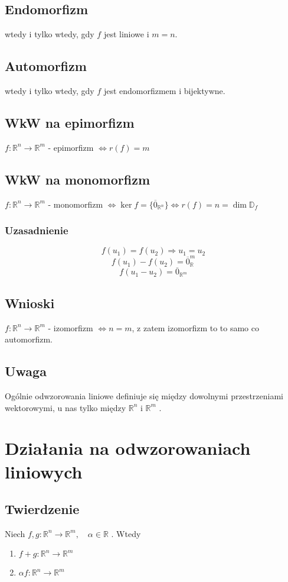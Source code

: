 \documentclass[11pt]{article}
\begin{document}
\subsection{Endomorfizm}
wtedy i tylko wtedy, gdy $f$ jest liniowe i $m = n $.
\subsection{Automorfizm}
wtedy i tylko wtedy, gdy $f$ jest endomorfizmem i bijektywne.

\subsection{WkW na epimorfizm}
$f: \mathbb{R}^n \to \mathbb{R}^m$ - epimorfizm $\iff r(f) = m$

\subsection{WkW na monomorfizm}
$f: \mathbb{R}^n \to \mathbb{R}^m$ - monomorfizm $\iff \ker{f} = \{\overline{0}_{\mathbb{R}^n}\} \iff r(f) = n = \dim{\mathbb{D}_f}$
\subsubsection{Uzasadnienie}
$$f(u_1) = f(u_2) \Longrightarrow u_1 = u_2$$
$$f(u_1) -f(u_2) = \overline{0}_{\mathbb{R}}^m$$
$$f(u_1 - u_2) = \overline{0}_{\mathbb{R}^m}$$
\subsection{Wnioski}
$f: \mathbb{R}^n \to \mathbb{R}^m$ - izomorfizm $\iff n = m $, z zatem izomorfizm to to samo co automorfizm.
\subsection{Uwaga}
Ogólnie odwzorowania liniowe definiuje się między dowolnymi przestrzeniami wektorowymi, u nas tylko między $\mathbb{R}^n$ i $\mathbb{R}^m$ .

\section{Działania na odwzorowaniach liniowych}
\subsection{Twierdzenie}
Niech $f,g : \mathbb{R}^n \to \mathbb{R}^m,\quad \alpha \in \mathbb{R}$ . Wtedy
\begin{enumerate}
\item{$f+g : \mathbb{R}^n \to \mathbb{R}^m$}
\item{$\alpha f : \mathbb{R}^n \to \mathbb{R}^m$}
\end{enumerate}
\end{document}
